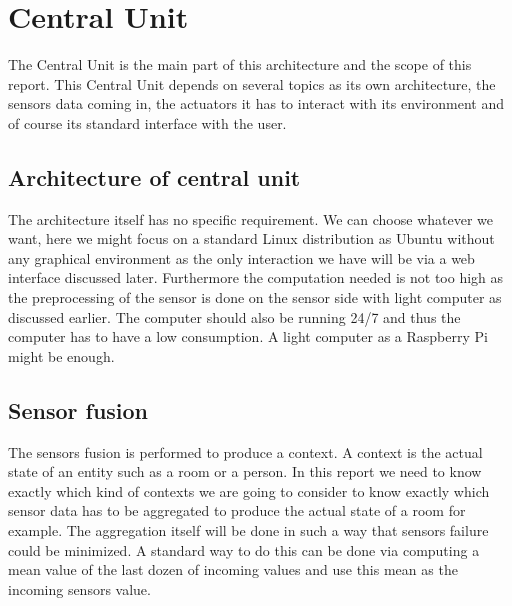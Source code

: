 \documentclass{acm_proc_article-sp}
\begin{document}
\section{Central Unit}	
The Central Unit is the main part of this architecture and the scope of this report. 
This Central Unit depends on several topics as its own architecture, the sensors data coming in, 
the actuators it has to interact with its environment and of course its standard interface with the user.
\subsection{Architecture of central unit}
The architecture itself has no specific requirement. 
We can choose whatever we want, here we might focus on a standard Linux distribution as Ubuntu without any graphical environment as the only interaction we have will be via a web interface discussed later. 
Furthermore the computation needed is not too high as the preprocessing of the sensor is done on the sensor side with light computer as discussed earlier. 
The computer should also be running 24/7 and thus the computer has to have a low consumption. A light computer as a Raspberry Pi might be enough.
\subsection{Sensor fusion}
The sensors fusion is performed to produce a context. A context is the actual state of an entity such as a room or a person. 
In this report we need to know exactly which kind of contexts we are going to consider to know exactly which sensor data has to be aggregated to produce the actual state of a room for example. 
The aggregation itself will be done in such a way that sensors failure could be minimized.
A standard way to do this can be done via computing a mean value of the last dozen of incoming values and use this mean as the incoming sensors value.
\end{document}

